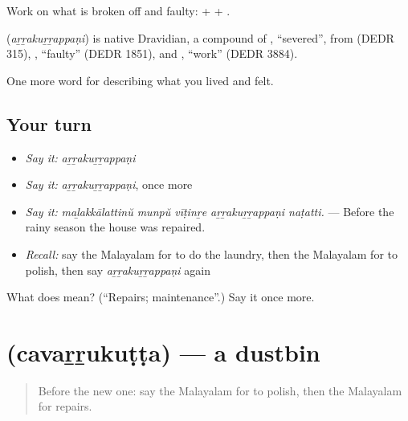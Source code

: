 Work on what is broken off and faulty:  +  + .

\begin{cousinweb}
\textbf{} (\emph{aṟṟakuṟṟappaṇi}) is native Dravidian, a compound of , \textquotedblleft{}severed\textquotedblright{}, from  (DEDR 315), , \textquotedblleft{}faulty\textquotedblright{} (DEDR 1851), and , \textquotedblleft{}work\textquotedblright{} (DEDR 3884).
\end{cousinweb}

\begin{grammarlens}[title={What you've built}]
One more word for describing what you lived and felt.
\end{grammarlens}

\subsection*{Your turn}
\begin{itemize}
\raggedright
  \item \emph{Say it:} \emph{aṟṟakuṟṟappaṇi}
  \item \emph{Say it:} \emph{aṟṟakuṟṟappaṇi}, once more
  \item \emph{Say it:} \emph{maḻakkālattinŭ munpŭ vīṭinṟe aṟṟakuṟṟappaṇi naṭatti.} — Before the rainy season the house was repaired.
  \item \emph{Recall:} say the Malayalam for to do the laundry, then the Malayalam for to polish, then say \emph{aṟṟakuṟṟappaṇi} again
\end{itemize}

\begin{tcolorbox}[breakable,colback=teal!4,colframe=teal!35!black,title={Before you move on}]
What does  mean? (\textquotedblleft{}Repairs; maintenance\textquotedblright{}.) Say it once more.
\end{tcolorbox}
\section[\texorpdfstring{\ml{ചവറ്റുകുട്ട} (cavaṟṟukuṭṭa)}{ചവറ്റുകുട്ട (cavaṟṟukuṭṭa)}]{ (cavaṟṟukuṭṭa) — a dustbin}

\label{lesson:ML-C571-cavarrukutta}



\begin{quote}
Before the new one: say the Malayalam for to polish, then the Malayalam for repairs.
\end{quote}

